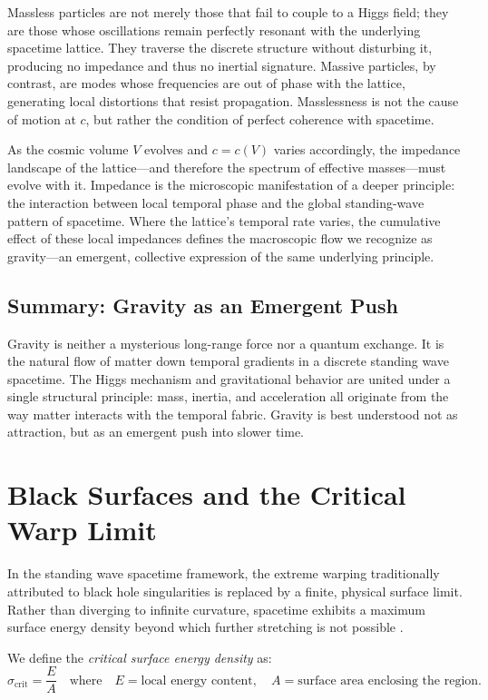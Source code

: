 \documentclass[12pt]{article}
\begin{document}
Massless particles are not merely those that fail to couple to a Higgs field; they are those whose oscillations remain perfectly resonant with the underlying spacetime lattice. They traverse the discrete structure without disturbing it, producing no impedance and thus no inertial signature. Massive particles, by contrast, are modes whose frequencies are out of phase with the lattice, generating local distortions that resist propagation. Masslessness is not the cause of motion at $c$, but rather the condition of perfect coherence with spacetime.

As the cosmic volume $V$ evolves and $c=c(V)$ varies accordingly, the impedance landscape of the lattice—and therefore the spectrum of effective masses—must evolve with it. Impedance is the microscopic manifestation of a deeper principle: the interaction between local temporal phase and the global standing-wave pattern of spacetime. Where the lattice’s temporal rate varies, the cumulative effect of these local impedances defines the macroscopic flow we recognize as gravity—an emergent, collective expression of the same underlying principle.


\subsection{Summary: Gravity as an Emergent Push}

Gravity is neither a mysterious long-range force nor a quantum exchange. It is the natural flow of matter down temporal gradients in a discrete standing wave spacetime. The Higgs mechanism and gravitational behavior are united under a single structural principle: mass, inertia, and acceleration all originate from the way matter interacts with the temporal fabric. Gravity is best understood not as attraction, but as an emergent push into slower time.

\section{Black Surfaces and the Critical Warp Limit}

In the standing wave spacetime framework, the extreme warping traditionally attributed to black hole singularities is replaced by a finite, physical surface limit. Rather than diverging to infinite curvature, spacetime exhibits a maximum surface energy density beyond which further stretching is not possible \cite{penrose1965, hawking1970}.

We define the \emph{critical surface energy density} as:
\[
\sigma_{\text{crit}} = \frac{E}{A}
\quad
\text{where}
\quad
E = \text{local energy content},
\quad
A = \text{surface area enclosing the region}.
\]
\end{document}
